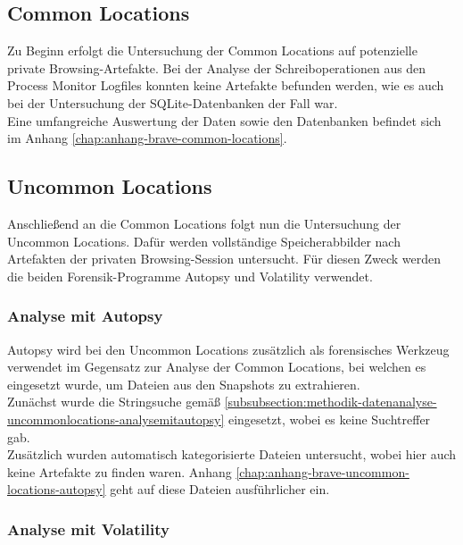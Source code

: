 \subsection*{Common Locations}\label{chap:ergebnisse-brave-common-locations}

Zu Beginn erfolgt die Untersuchung der Common Locations auf potenzielle private Browsing-Artefakte. Bei der Analyse der Schreiboperationen aus den Process Monitor Logfiles konnten keine Artefakte befunden werden, wie es auch bei der Untersuchung der SQLite-Datenbanken der Fall war.\\
Eine umfangreiche Auswertung der Daten sowie den Datenbanken befindet sich im Anhang \ref{chap:anhang-brave-common-locations}.

\subsection*{Uncommon Locations}\label{chap:ergebnisse-brave-uncommon-locations}

Anschließend an die Common Locations folgt nun die Untersuchung der Uncommon Locations. Dafür werden vollständige Speicherabbilder nach Artefakten der privaten Browsing-Session untersucht. Für diesen Zweck werden die beiden Forensik-Programme Autopsy und Volatility verwendet.

\subsubsection*{Analyse mit Autopsy}\label{chap:ergebnisse-brave-uncommon-locations-autopsy}

Autopsy wird bei den Uncommon Locations zusätzlich als forensisches Werkzeug verwendet im Gegensatz zur Analyse der Common Locations, bei welchen es eingesetzt wurde, um Dateien aus den Snapshots zu extrahieren.\\
Zunächst wurde die Stringsuche gemäß \autoref{subsubsection:methodik-datenanalyse-uncommonlocations-analysemitautopsy} eingesetzt, wobei es keine Suchtreffer gab.\\
Zusätzlich wurden automatisch kategorisierte Dateien untersucht, wobei hier auch keine Artefakte zu finden waren. Anhang \ref{chap:anhang-brave-uncommon-locations-autopsy} geht auf diese Dateien ausführlicher ein.

\subsubsection*{Analyse mit Volatility}\label{chap:ergebnisse-brave-uncommon-locations-volatility}

